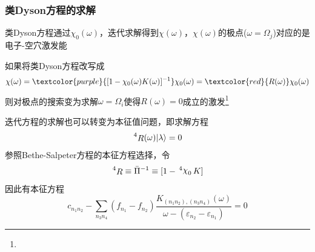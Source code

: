 \frame
{
	\frametitle{类\textrm{Dyson}方程的求解}
	类\textrm{Dyson}方程通过$\chi_0(\omega)$，迭代求解得到$\chi(\omega)$，$\chi(\omega)$的极点($\omega=\Omega_j$)对应的是电子-空穴激发能

	如果将类\textrm{Dyson}方程改写成
	\begin{displaymath}
		\chi(\omega)=\textcolor{purple}{[1-\chi_0(\omega)K(\omega)]^{-1}}\chi_0(\omega)=\textcolor{red}{R(\omega)}\chi_0(\omega)
	\end{displaymath}
	则对极点的搜索变为求解$\omega=\Omega_i$使得$R(\omega)=0$成立的激发\footnote{\fontsize{5.8pt}{4.2pt}}

	迭代方程的求解也可以转变为本征值问题，即求解方程
	\begin{displaymath}
		\sideset{^4}{}{\mathop{R}}(\omega)|\lambda\rangle=0
	\end{displaymath}
	参照\textrm{Bethe-Salpeter}方程的本征方程选择，令
	\begin{displaymath}
		\sideset{^4}{}{\mathop{R}}\equiv\bar{\Pi}^{-1}\equiv[1-\sideset{^4}{_0}{\mathop{\chi}}K]
	\end{displaymath}
因此有本征方程
	\begin{displaymath}
		c_{n_1n_2}-\sum_{n_3n_4}(f_{n_1}-f_{n_2})\frac{K_{(n_1n_2),(n_3n_4)}(\omega)}{\omega-(\varepsilon_{n_2}-\varepsilon_{n_1})}=0
	\end{displaymath}
}

